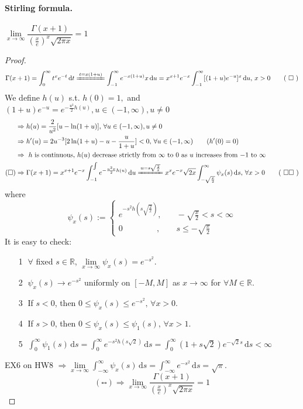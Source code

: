  \paragraph{Stirling formula.}$ \lim\limits_{x\to\infty}\dfrac{\Gamma(x+1) }{(\frac{x }{e})^x\sqrt{2\pi x }}=1  $  
 \begin{proof}
    \[\Gamma(x+1)=\int_{0 }^{\infty} t^xe^{-t }\, \mathrm{d}t \xlongequal[]{t=x(1+u)}\int_{-1 }^{\infty } e^{-x(1+u )}x\, \mathrm{d}u=x^{x+1}e^{-x}\int_{-1 }^{\infty} [(1+u)e^{-u }]^x\, \mathrm{d}u,\,x>0 \tag{ $ \square $ }  \]
    We define  $ h(u)  $ s.t. $ h(0)=1, $ and $ (1+u)e^{-u}=e^{-\frac{u^2 }{2 }h(u)},u\in(-1,\infty),u\not=0 $ 
    \begin{align*}
        &\Rightarrow h(u)=\frac{2}{u^2 }[u-\ln(1+u)],\,\forall u\in(-1,\infty),u\not=0\\
        &\Rightarrow h'(u)=2u^{-3}[2\ln(1+u)-u-\frac{u }{1+u }]<0,\,\forall u \in (-1,\infty )\qquad( h'(0)=0 )\\
        &\Rightarrow \text{ $ h  $ is continuous,  $ h(u) $ decrease strictly from  $ \infty  $ to  $ 0  $ as  $ u  $ increases from  $ -1  $ to  $ \infty  $ }\\
        (\square)&\Rightarrow\Gamma(x+1)=x^{x+1}e^{-x}\int_{-1 }^{\int } e^{-\frac{u^2x }{2 }h(u) }\, \mathrm{d}u \xlongequal[]{u=s\sqrt{\frac{2 }{x }}}x^xe^{-x}\sqrt{2x }\int_{-\sqrt{\frac{x }{2 }}}^{\infty } \psi_x(s)\, \mathrm{d}s ,\,\forall x>0\tag{ $ \square\square $ } 
    \end{align*}
    where  \[ \psi_x(s):=\left\{
        \begin{aligned}
            e^{-s^2h(s\sqrt{\frac{2 }{x }})}{},&\quad -\sqrt{\frac{x }{2 }}<s<\infty\\
            0\qquad\qquad\,,&\quad s \leqslant -\sqrt{\frac{x }{2 }}
        \end{aligned}
    \right. \] 
    It is easy to check:
    \begin{enumerate}
        \item[\textcircled{1}]  $ \forall   $ fixed  $ s\in\mathbb{R } $,  $ \lim\limits_{x\to\infty }\psi_x(s)=e^{-s^2}  $.
        \item[\textcircled{2}]  $ \psi_x(s)\rightarrow e^{-s^2} $ uniformly on  $ [-M,M ] $ as  $ x\to \infty  $ for  $ \forall M\in\mathbb{R } $.
        \item[\textcircled{3}] If  $ s<0  $, then  $ 0 \leqslant \psi_x(s) \leqslant e^{-s^2},\,\forall x>0 $.
        \item[\textcircled{4}] If  $ s>0  $, then  $ 0 \leqslant \psi_x(s) \leqslant \psi_1(s),\,\forall x>1 $.
        \item[\textcircled{5}]  $ \int_{0 }^{\infty } \psi_1(s)\, \mathrm{d}s=\int_{0}^{\infty} e^{-s^2h(s\sqrt{2})}\, \mathrm{d}s=\int_{0}^{\infty } (1+s\sqrt{2 })e^{-\sqrt{2}s}\, \mathrm{d}s<\infty     $     
    \end{enumerate}
    EX6 on HW8  $ \Rightarrow \lim\limits_{x\to\infty } \int_{-\infty }^{\infty } \psi_x(s)\, \mathrm{d}s=\int_{-\infty }^{\infty } e^{-s^2 }\, \mathrm{d}s=\sqrt{\pi }    $.
    \[(\square\square)\Rightarrow \lim\limits_{x\to\infty}\dfrac{\Gamma(x+1) }{(\frac{x }{e})^x\sqrt{2\pi x }}=1  \] 
\end{proof}
